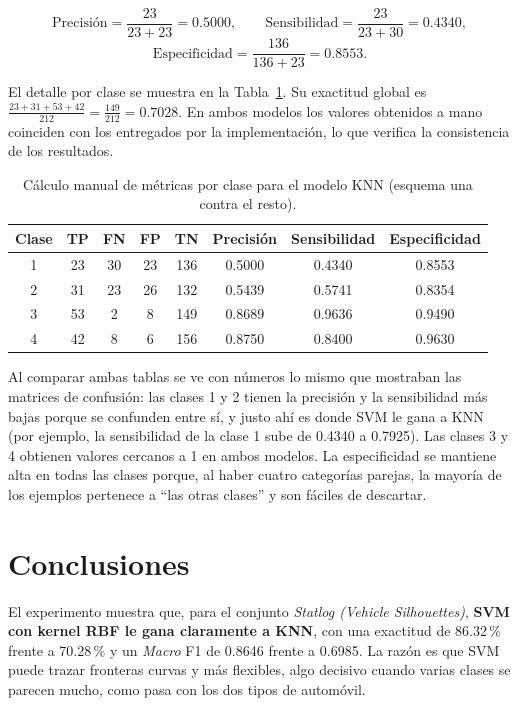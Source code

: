 \documentclass[11pt,letterpaper,twoside]{article}
\begin{document}
\begin{resultado}
\[
\text{Precisión} = \frac{23}{23+23} = 0.5000, \qquad
\text{Sensibilidad} = \frac{23}{23+30} = 0.4340,
\]
\[
\text{Especificidad} = \frac{136}{136+23} = 0.8553.
\]
\end{resultado}

El detalle por clase se muestra en la Tabla~\ref{tab:manualknn}. Su exactitud global es $\tfrac{23+31+53+42}{212}=\tfrac{149}{212}=0.7028$. En ambos modelos los valores obtenidos a mano coinciden con los entregados por la implementación, lo que verifica la consistencia de los resultados.

\begin{table}[H]
\centering
\caption{Cálculo manual de métricas por clase para el modelo KNN (esquema una contra el resto).}
\label{tab:manualknn}
\begin{tabular}{cccccccc}
\toprule
\textbf{Clase} & \textbf{TP} & \textbf{FN} & \textbf{FP} & \textbf{TN} & \textbf{Precisión} & \textbf{Sensibilidad} & \textbf{Especificidad} \\
\midrule
1 & 23 & 30 & 23 & 136 & 0.5000 & 0.4340 & 0.8553 \\
2 & 31 & 23 & 26 & 132 & 0.5439 & 0.5741 & 0.8354 \\
3 & 53 &  2 &  8 & 149 & 0.8689 & 0.9636 & 0.9490 \\
4 & 42 &  8 &  6 & 156 & 0.8750 & 0.8400 & 0.9630 \\
\bottomrule
\end{tabular}
\end{table}

Al comparar ambas tablas se ve con números lo mismo que mostraban las matrices de confusión: las clases 1 y 2 tienen la precisión y la sensibilidad más bajas porque se confunden entre sí, y justo ahí es donde SVM le gana a KNN (por ejemplo, la sensibilidad de la clase 1 sube de 0.4340 a 0.7925). Las clases 3 y 4 obtienen valores cercanos a 1 en ambos modelos. La especificidad se mantiene alta en todas las clases porque, al haber cuatro categorías parejas, la mayoría de los ejemplos pertenece a ``las otras clases'' y son fáciles de descartar.

\section{Conclusiones}
\label{sec:conclusiones}

El experimento muestra que, para el conjunto \textit{Statlog (Vehicle Silhouettes)}, \textbf{SVM con kernel RBF le gana claramente a KNN}, con una exactitud de 86.32\,\% frente a 70.28\,\% y un \textit{Macro} F1 de 0.8646 frente a 0.6985. La razón es que SVM puede trazar fronteras curvas y más flexibles, algo decisivo cuando varias clases se parecen mucho, como pasa con los dos tipos de automóvil.
\end{document}
